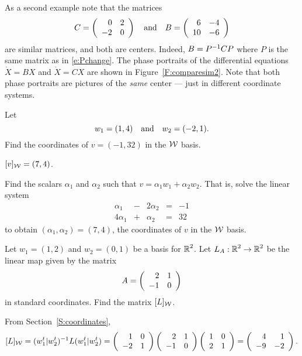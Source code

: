 \documentclass{ximera}
\begin{document}
\begin{figure*}[htb]
        \centerline{%
        }
        \caption{Phase planes for the saddles $\dot{X}=BX$ and $\dot{X}=CX$.}
        \label{F:comparesim}
\end{figure*}

As a second example note that the matrices
\[
C = \left(\begin{array}{rr} 0 & 2\\ -2 &0\end{array}\right) \quad\mbox{and}\quad B = \left(\begin{array}{rr} 6 & -4\\ 10 &-6\end{array}\right)
\]
are similar matrices, and both are centers.   Indeed, $B = P^{-1} CP$
where $P$ is the same matrix as in \eqref{e:Pchange}.  The phase portraits
of the differential equations $\dot{X}=BX$ and $\dot{X}=CX$ are shown in
Figure~\ref{F:comparesim2}.  Note that both phase portraits are pictures
of the {\em same\/} center --- just in different coordinate
systems.



\begin{figure*}[htb]
        \centerline{%
        }
        \caption{Phase planes for the centers $\dot{X}=BX$ and $\dot{X}=CX$.}
        \label{F:comparesim2}
\end{figure*}






\EXER

\TEXER

\begin{exercise} \label{c7.1.1}
Let
\[
w_1 = (1,4) \quad\mbox{and}\quad w_2 = (-2,1).
\]
Find the coordinates of $v=(-1,32)$ in the ${\cal W}$ basis.

\begin{solution}

\ans $[v]_{\cal W} = (7,4)$.

\soln Find the scalars $\alpha_1$ and $\alpha_2$ such that $v = \alpha_1w_1
+ \alpha_2w_2$.  That is, solve the linear system
\[ \begin{array}{rrrrr}
\alpha_1 & - & 2\alpha_2 & = & -1 \\
4\alpha_1 & + & \alpha_2 & = & 32 \end{array} \]
to obtain $(\alpha_1,\alpha_2) = (7,4)$, the coordinates
of $v$ in the ${\cal W}$ basis.

\end{solution}
\end{exercise}

\begin{exercise} \label{c7.3.1}
Let $w_1=(1,2)$ and $w_2=(0,1)$ be a basis for $\mbox{$\Bbb{R}$}^2$.  Let
$L_A:\mbox{$\Bbb{R}$}^2\to\mbox{$\Bbb{R}$}^2$ be the linear map given by the matrix
\[
A=\left(\begin{array}{rr} 2 & 1\\ -1 &0\end{array}\right)
\]
in standard coordinates.  Find the matrix $[L]_{\cal W}$.

\begin{solution}

\soln From Section~\ref{S:coordinates},
\[
[L]_{\cal W} = (w_1^t|w_2^t)^{-1}L(w_1^t|w_2^t) =
\left(\begin{array}{rr} 1 & 0\\ -2 &1\end{array}\right)\left(\begin{array}{rr} 2 & 1\\ -1 &0\end{array}\right)\left(\begin{array}{rr} 1 & 0\\ 2 &1\end{array}\right) =
\left(\begin{array}{rr} 4 & 1\\ -9 &-2\end{array}\right).
\]

\end{solution}
\end{exercise}
\end{document}
